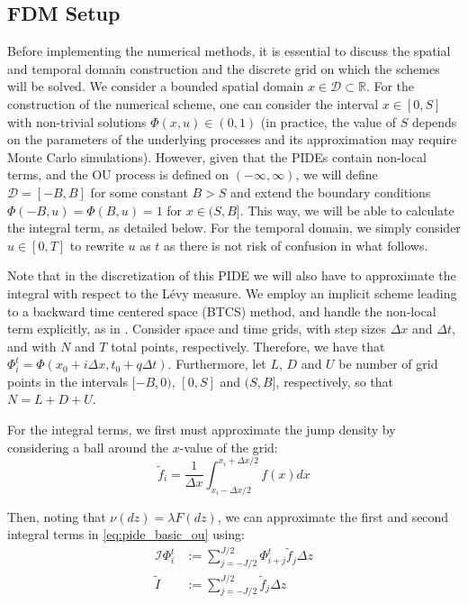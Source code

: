 \documentclass[11pt,twoside,openright]{report}
\begin{document}
\subsection{FDM Setup}

Before implementing the numerical methods, it is essential to discuss the spatial and temporal domain construction and the discrete grid on which the schemes will be solved. We consider a bounded spatial domain $x \in \mathcal{D} \subset \mathbb{R}$. For the construction of the numerical scheme, one can consider the interval $x \in [0, S]$ with non-trivial solutions $\Phi(x, u) \in (0, 1)$ (in practice, the value of $S$ depends on the parameters of the underlying processes and its approximation may require Monte Carlo simulations). However, given that the PIDEs contain non-local terms, and the OU process is defined on $(-\infty, \infty)$, we will define $\mathcal{D} = [-B, B]$ for some constant $B > S$ and extend the boundary conditions $\Phi(-B, u) = \Phi(B, u) = 1$ for $x \in (S, B]$. This way, we will be able to calculate the integral term, as detailed below. For the temporal domain, we simply consider $u \in [0, T]$ to rewrite $u$ as $t$ as there is not risk of confusion in what follows.

Note that in the discretization of this PIDE we will also have to approximate the integral with respect to the Lévy measure. We employ an implicit scheme leading to a backward time centered space (BTCS) method, and handle the non-local term explicitly, as in \cite{cont2005finite}. Consider space and time grids, with step sizes $\Delta x$ and $\Delta t$, and with $N$ and $T$ total points, respectively. Therefore, we have that $\Phi^t_i = \Phi(x_0 + i\Delta x, t_0 + q\Delta t)$. Furthermore, let $L$, $D$ and $U$ be number of grid points in the intervals $[-B, 0)$, $[0, S]$ and $(S, B]$, respectively, so that $N = L + D + U$.

For the integral terms, we first must approximate the jump density by considering a ball around the $x$-value of the grid:
\begin{equation}
\tilde{f}_i = \frac{1}{\Delta x} \int_{x_i - \Delta x/2}^{x_i + \Delta x/2} f(x) dx
\label{eq:jump_density_approximation}
\end{equation}

Then, noting that $\nu(dz) = \lambda F(dz)$, we can approximate the first and second integral terms in \eqref{eq:pide_basic_ou} using:
\begin{align}
\mathcal{I}\Phi^t_i &:= \sum_{j=-J/2}^{J/2} \Phi^t_{i+j} \tilde{f}_j \Delta z \label{eq:integral_approximation_1} \\
\tilde{I} &:= \sum_{j=-J/2}^{J/2} \tilde{f}_j \Delta z \label{eq:integral_approximation_2}
\end{align}
\end{document}
